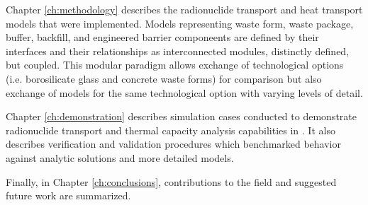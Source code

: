
Chapter \ref{ch:methodology} describes the radionuclide transport and heat transport 
models that were implemented. Models representing waste form, waste package, 
buffer, backfill, and engineered barrier componeents are defined by their 
interfaces and their relationships as interconnected modules, distinctly 
defined, but coupled. This modular paradigm allows exchange  of technological 
options (i.e. borosilicate glass and concrete waste forms) for comparison but 
also exchange of models for the same technological option with varying levels 
of detail.  


Chapter \ref{ch:demonstration} describes simulation cases conducted to 
demonstrate radionuclide transport and thermal capacity analysis capabilities in \Cyder. It 
also describes verification and validation procedures which benchmarked \Cyder 
behavior against analytic solutions and more detailed models.


Finally, in Chapter \ref{ch:conclusions}, contributions to the field and 
suggested future work are summarized. 




% 

